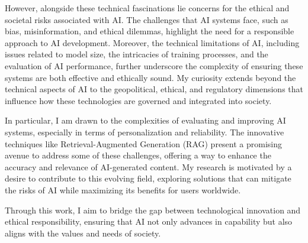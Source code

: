 However, alongside these technical fascinations lie concerns for the ethical and societal risks associated with AI. The challenges that AI systems face, such as bias, misinformation, and ethical dilemmas, highlight the need for a responsible approach to AI development. Moreover, the technical limitations of AI, including issues related to model size, the intricacies of training processes, and the evaluation of AI performance, further underscore the complexity of ensuring these systems are both effective and ethically sound. My curiosity extends beyond the technical aspects of AI to the geopolitical, ethical, and regulatory dimensions that influence how these technologies are governed and integrated into society.

In particular, I am drawn to the complexities of evaluating and improving AI systems, especially in terms of personalization and reliability. The innovative techniques like Retrieval-Augmented Generation (RAG) present a promising avenue to address some of these challenges, offering a way to enhance the accuracy and relevance of AI-generated content. My research is motivated by a desire to contribute to this evolving field, exploring solutions that can mitigate the risks of AI while maximizing its benefits for users worldwide. 

Through this work, I aim to bridge the gap between technological innovation and ethical responsibility, ensuring that AI not only advances in capability but also aligns with the values and needs of society.

